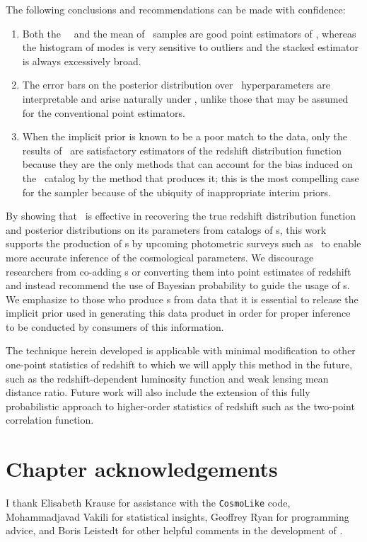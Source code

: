 The following conclusions and recommendations can be made with confidence:

\begin{enumerate}
	\item Both the \Chippr\ \mmle\ and the mean of \chippr\ samples are good point estimators of \nz, whereas the histogram of modes is very sensitive to outliers and the stacked estimator is always excessively broad.
	\item The error bars on the posterior distribution over \nz\ hyperparameters are interpretable and arise naturally under \Chippr, unlike those that may be assumed for the conventional point estimators.
	\item When the implicit prior is known to be a poor match to the data, only the results of \Chippr\ are satisfactory estimators of the redshift distribution function because they are the only methods that can account for the bias induced on the \pzpdf\ catalog by the method that produces it; this is the most compelling case for the sampler because of the ubiquity of inappropriate interim priors.
\end{enumerate}

By showing that \Chippr\ is effective in recovering the true redshift distribution function and posterior distributions on its parameters from catalogs of \pzpdf s, this work supports the production of \pzpdf s by upcoming photometric surveys such as \lsst\ to enable more accurate inference of the cosmological parameters.  
We discourage researchers from co-adding \pzpdf s or converting them into point estimates of redshift and instead recommend the use of Bayesian probability to guide the usage of \pzpdf s.  
We emphasize to those who produce \pzpdf s from data that it is essential to release the implicit prior used in generating this data product in order for proper inference to be conducted by consumers of this information.

The technique herein developed is applicable with minimal modification to other one-point statistics of redshift to which we will apply this method in the future, such as the redshift-dependent luminosity function and weak lensing mean distance ratio.  
Future work will also include the extension of this fully probabilistic approach to higher-order statistics of redshift such as the two-point correlation function.

\section*{Chapter acknowledgements}

I thank Elisabeth Krause for assistance with the \texttt{CosmoLike} code, Mohammadjavad Vakili for statistical insights, Geoffrey Ryan for programming advice, and Boris Leistedt for other helpful comments in the development of \Chippr.
